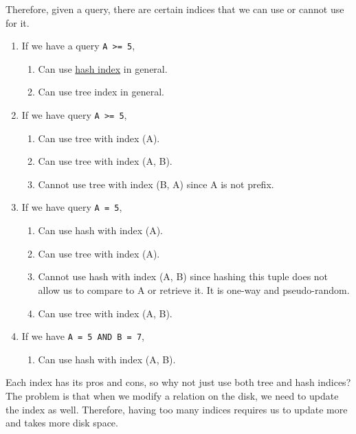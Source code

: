   \begin{example}
    \label{ex:which-indices-a-query-can-use}
    Therefore, given a query, there are certain indices that we can use or cannot use for it.
    \begin{enumerate}
      \item If we have a query \texttt{A >= 5}, 
        \begin{enumerate}
          \item Can use \hyperref[def:hash-index]{hash index} in general.  
          \item Can use tree index in general. 
        \end{enumerate}

      \item If we have query \texttt{A >= 5}, 
        \begin{enumerate}
          \item Can use tree with index (A). 
          \item Can use tree with index (A, B). 
          \item Cannot use tree with index (B, A) since A is not prefix. 
        \end{enumerate}

      \item If we have query \texttt{A = 5},
        \begin{enumerate}
          \item Can use hash with index (A). 
          \item Can use tree with index (A). 
          \item Cannot use hash with index (A, B) since hashing this tuple does not allow us to compare to A or retrieve it. It is one-way and pseudo-random.   
          \item Can use tree with index (A, B). 
        \end{enumerate}

      \item If we have \texttt{A = 5 AND B = 7}, 
        \begin{enumerate}
          \item Can use hash with index (A, B). 
        \end{enumerate}
    \end{enumerate}
  \end{example}

  Each index has its pros and cons, so why not just use both tree and hash indices? The problem is that when we modify a relation on the disk, we need to update the index as well. Therefore, having too many indices requires us to update more and takes more disk space. 

